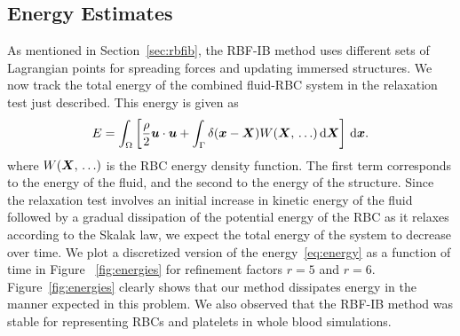 \subsection{Energy Estimates}\label{sec:energy-est}

As mentioned in Section~\ref{sec:rbfib}, the RBF-IB method uses different sets of
Lagrangian points for spreading forces and updating immersed structures. We now track the
total energy of the combined fluid-RBC system in the relaxation test just described.
This energy is given as 
\begin{align}
    E = \int_\domain \left[\frac{\density}2\u\cdot\u + \int_\interface \Dirac(\x-\X)W(\X,\,\ldots)\d\X\right] \d\x.
\label{eq:energy}
\end{align}
where $W(\boldsymbol{X},\,\ldots)$ is the RBC energy density function. The first term corresponds to
the energy of the fluid, and the second to the energy of the structure. Since the
relaxation test involves an initial increase in kinetic energy of the fluid followed by a
gradual dissipation of the potential energy of the RBC as it relaxes according to the
Skalak law, we expect the total energy of the system to decrease over time. We plot a
discretized version of the energy~\eqref{eq:energy} as a function of time in Figure~%
\ref{fig:energies} for refinement factors $r=5$ and $r=6$. Figure~\ref{fig:energies}
clearly shows that our method dissipates energy in the manner expected in this problem.
We also observed that the RBF-IB method was stable for representing RBCs and platelets in
whole blood simulations.


